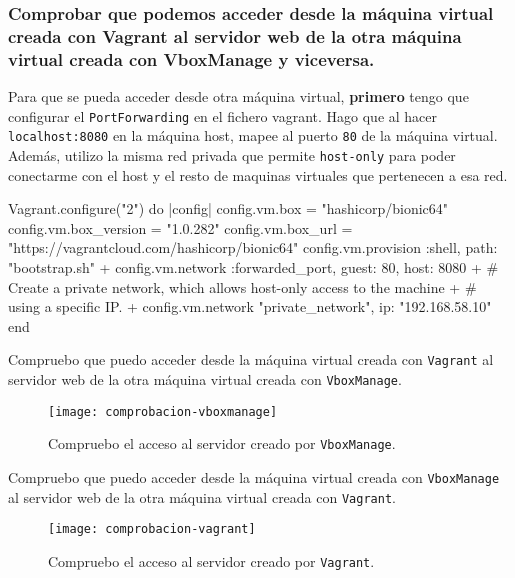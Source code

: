 \subsubsection{Comprobar que podemos acceder desde la máquina virtual creada con Vagrant al servidor web de la otra máquina virtual creada con VboxManage y viceversa.}
\par Para que se pueda acceder desde otra máquina virtual, \textbf{primero} tengo que configurar el 
\texttt{PortForwarding} en el fichero vagrant. Hago que al hacer \texttt{localhost:8080} en
la máquina host, mapee al puerto \texttt{80} de la máquina virtual. Además, utilizo la misma 
red privada que permite \texttt{host-only} para poder conectarme con el host y el resto 
de maquinas virtuales que pertenecen a esa red.
\begin{listing}
    Vagrant.configure("2") do |config|
        config.vm.box = "hashicorp/bionic64"
        config.vm.box_version = "1.0.282"
        config.vm.box_url = "https://vagrantcloud.com/hashicorp/bionic64"
        config.vm.provision :shell, path: "bootstrap.sh"
  +     config.vm.network :forwarded_port, guest: 80, host: 8080
  +     # Create a private network, which allows host-only access to the machine
  +     # using a specific IP.
  +     config.vm.network "private_network", ip: "192.168.58.10"
    end
 \end{listing}
\par Compruebo que puedo acceder desde la máquina virtual creada con \texttt{Vagrant} al servidor web de la otra máquina virtual creada con \texttt{VboxManage}.
  \begin{figure}[H]
    \texttt{[image: comprobacion-vboxmanage]}
    \centering
    \caption{Compruebo el acceso al servidor creado por \texttt{VboxManage}.}
    \label{fig:comprobacion-vboxmanage}
 \end{figure}
\par Compruebo que puedo acceder desde la máquina virtual creada con \texttt{VboxManage} al servidor web de la otra máquina virtual creada con \texttt{Vagrant}.
  \begin{figure}[H]
    \texttt{[image: comprobacion-vagrant]}
    \centering
    \caption{Compruebo el acceso al servidor creado por \texttt{Vagrant}.}
    \label{fig:comprobacion-vagrant}
 \end{figure}
